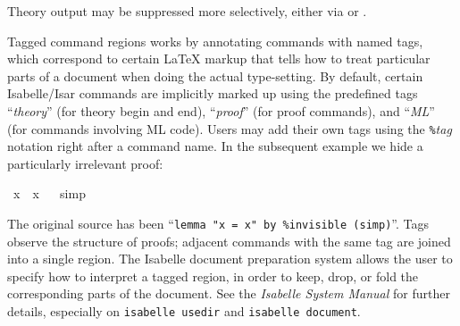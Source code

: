 \begin{isabellebody}
\begin{isamarkuptext}
  \medskip Theory output may be suppressed more selectively, either
  via  or .

  Tagged command regions works by annotating commands with named tags,
  which correspond to certain {\LaTeX} markup that tells how to treat
  particular parts of a document when doing the actual type-setting.
  By default, certain Isabelle/Isar commands are implicitly marked up
  using the predefined tags ``\emph{theory}'' (for theory begin and
  end), ``\emph{proof}'' (for proof commands), and ``\emph{ML}'' (for
  commands involving ML code).  Users may add their own tags using the
  \verb,%,\emph{tag} notation right after a command name.  In the
  subsequent example we hide a particularly irrelevant proof:%
\end{isamarkuptext}%
\isamarkuptrue%
\isamarkupfalse%
\ {}x\ {}\ x{}%
\isadeliminvisible
\ %
\endisadeliminvisible
%
\isataginvisible
{}\isamarkupfalse%
\ {}simp{}%
\endisataginvisible
{\isafoldinvisible}%
%
\isadeliminvisible
%
\endisadeliminvisible
%
\begin{isamarkuptext}%
The original source has been ``\verb,lemma "x = x" by %invisible (simp),''.
  Tags observe the structure of proofs; adjacent commands with the
  same tag are joined into a single region.  The Isabelle document
  preparation system allows the user to specify how to interpret a
  tagged region, in order to keep, drop, or fold the corresponding
  parts of the document.  See the \emph{Isabelle System Manual}
  \cite{isabelle-sys} for further details, especially on
  \texttt{isabelle usedir} and \texttt{isabelle document}.


\end{isamarkuptext}
\end{isabellebody}
